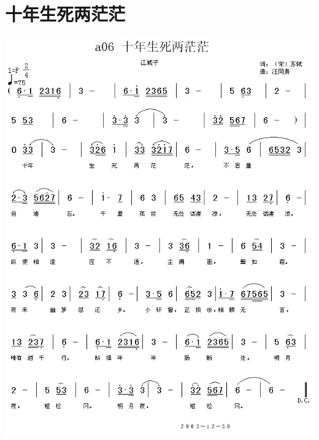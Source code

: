 \documentclass[cn,pad,chinesefont=nofont]{elegantbook}
\begin{document}
\section{十年生死两茫茫}
    \includegraphics[width=\textwidth]{dongxiao/20200627-苏轼-十年生死两茫茫.jpg} 
\end{document}
